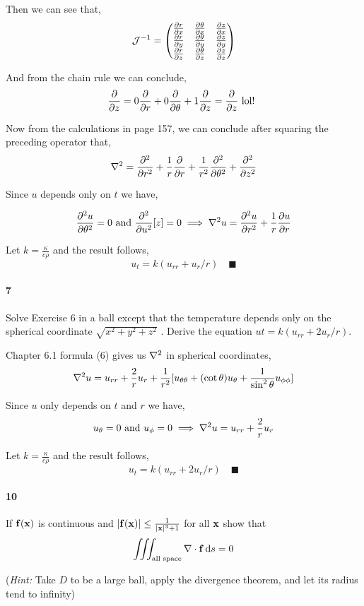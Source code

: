\documentclass{article}
\begin{document}
Then we can see that, \[\mathcal{J}^{-1} = \begin{pmatrix} \pdv{r}{x}&\pdv{\theta}{x}&\pdv{z}{x} \\
    \pdv{r}{y}&\pdv{\theta}{y}&\pdv{z}{y} \\
  \pdv{r}{z}&\pdv{\theta}{z}&\pdv{z}{z} \end{pmatrix}\]

And from the chain rule we can conclude,
\[\pdv{}{z} = 0\pdv{}{r}+0\pdv{}{\theta}+1\pdv{}{z} = \pdv{}{z} \text{
    lol! }\]

Now from the calculations in page 157, we can conclude after squaring
the preceding operator that,
\[\laplacian = \pdv[2]{}{r} +\frac{1}{r}\pdv{}{r}
  +\frac{1}{r^2}\pdv[2]{}{\theta} +\pdv[2]{}{z}\]

Since $u$ depends only on $t$ we have,

\[\pdv[2]{u}{\theta} = 0 \text{ and } \pdv[2]{u}[z]= 0\implies
  \laplacian{u} = \pdv[2]{u}{r} +\frac{1}{r}\pdv{u}{r}\]

Let $k= \frac{\kappa}{c\rho}$ and the result follows,
\[u_t = k(u_{rr} + u_r/r)\quad \blacksquare\]
\paragraph{7} Solve Exercise 6 in a ball except
 that the temperature depends
 only on the spherical coordinate $\sqrt{x^2 + y^2 + z^2}$ . Derive the equation
 $u t = k(u_{rr} + 2u_r /r )$.


 Chapter 6.1 formula (6) gives us $\laplacian$ in spherical
 coordinates,
 \[\laplacian u = u_{rr} +\frac{2}{r}u_r +\frac{1}{r^2}[u_{\theta\theta}
   +(\cot{\theta}) u_\theta +\frac{1}{\sin^2{\theta}} u_{\phi\phi}]\]

 Since $u$ only depends on $t$ and $r$ we have,
 \[u_\theta = 0 \text{ and }u_\phi = 0 \implies \laplacian u = u_{rr}
   +\frac{2}{r}u_r\]

 Let $k= \frac{\kappa}{c\rho}$ and the result follows,
\[u_t = k(u_{rr} + 2u_r/r)\quad \blacksquare\]
\paragraph{10} If $\bold{f(x)}$ is continuous and $|\vb{f(x)}|\leq
\frac{1}{|\bold{x}|^3+1}$ for all $\bold{x}$ show that
\[\iiint_{\text{all space}} \nabla\cdot \bold{f} \dd{s} = 0\]

(\textit{Hint:} Take $D$ to be a large ball, apply the divergence
theorem, and let its radius tend to infinity)
\end{document}
